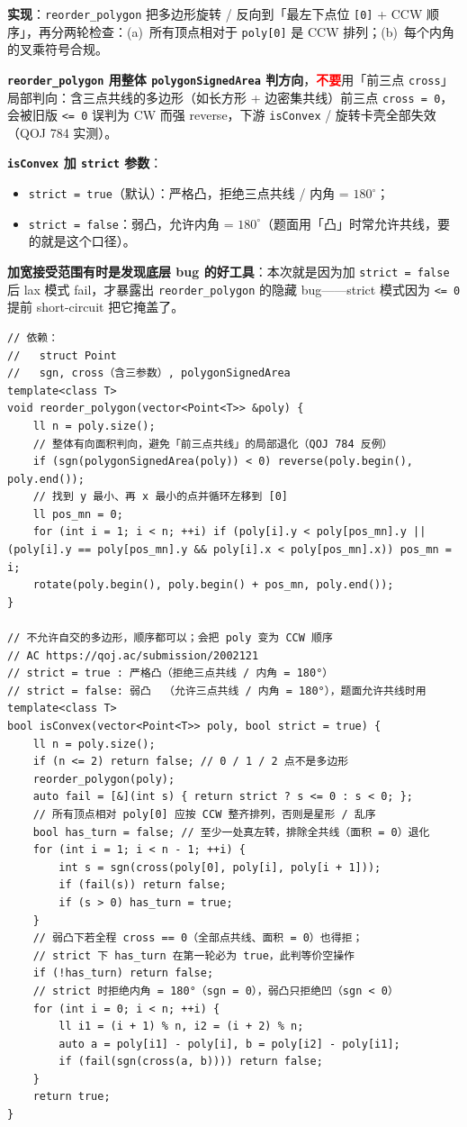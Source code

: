 		\textbf{实现}：\texttt{reorder\_polygon} 把多边形旋转 / 反向到「最左下点位 \texttt{[0]} + CCW 顺序」，再分两轮检查：(a)~所有顶点相对于 \texttt{poly[0]} 是 CCW 排列；(b)~每个内角的叉乘符号合规。

		\textbf{\texttt{reorder\_polygon} 用整体 \texttt{polygonSignedArea} 判方向}，\textcolor{red}{\textbf{不要}}用「前三点 \texttt{cross}」局部判向：含三点共线的多边形（如长方形 + 边密集共线）前三点 \texttt{cross = 0}，会被旧版 \texttt{<= 0} 误判为 CW 而强 reverse，下游 \texttt{isConvex} / 旋转卡壳全部失效（QOJ 784 实测）。

		\textbf{\texttt{isConvex} 加 \texttt{strict} 参数}：
		\begin{itemize}
					\setlength\itemsep{0pt}
				\item \texttt{strict = true}（默认）：严格凸，拒绝三点共线 / 内角 = $180^{\circ}$；
				\item \texttt{strict = false}：弱凸，允许内角 = $180^{\circ}$（题面用「凸」时常允许共线，要的就是这个口径）。
		\end{itemize}
		\textbf{加宽接受范围有时是发现底层 bug 的好工具}：本次就是因为加 \texttt{strict = false} 后 lax 模式 fail，才暴露出 \texttt{reorder\_polygon} 的隐藏 bug——strict 模式因为 \texttt{<= 0} 提前 short-circuit 把它掩盖了。

		\begin{verbatim}
// 依赖：
//   struct Point
//   sgn, cross（含三参数）, polygonSignedArea
template<class T>
void reorder_polygon(vector<Point<T>> &poly) {
	ll n = poly.size();
	// 整体有向面积判向，避免「前三点共线」的局部退化（QOJ 784 反例）
	if (sgn(polygonSignedArea(poly)) < 0) reverse(poly.begin(), poly.end());
	// 找到 y 最小、再 x 最小的点并循环左移到 [0]
	ll pos_mn = 0;
	for (int i = 1; i < n; ++i) if (poly[i].y < poly[pos_mn].y || (poly[i].y == poly[pos_mn].y && poly[i].x < poly[pos_mn].x)) pos_mn = i;
	rotate(poly.begin(), poly.begin() + pos_mn, poly.end());
}

// 不允许自交的多边形，顺序都可以；会把 poly 变为 CCW 顺序
// AC https://qoj.ac/submission/2002121
// strict = true : 严格凸（拒绝三点共线 / 内角 = 180°）
// strict = false: 弱凸  （允许三点共线 / 内角 = 180°），题面允许共线时用
template<class T>
bool isConvex(vector<Point<T>> poly, bool strict = true) {
	ll n = poly.size();
	if (n <= 2) return false; // 0 / 1 / 2 点不是多边形
	reorder_polygon(poly);
	auto fail = [&](int s) { return strict ? s <= 0 : s < 0; };
	// 所有顶点相对 poly[0] 应按 CCW 整齐排列，否则是星形 / 乱序
	bool has_turn = false; // 至少一处真左转，排除全共线（面积 = 0）退化
	for (int i = 1; i < n - 1; ++i) {
		int s = sgn(cross(poly[0], poly[i], poly[i + 1]));
		if (fail(s)) return false;
		if (s > 0) has_turn = true;
	}
	// 弱凸下若全程 cross == 0（全部点共线、面积 = 0）也得拒；
	// strict 下 has_turn 在第一轮必为 true，此判等价空操作
	if (!has_turn) return false;
	// strict 时拒绝内角 = 180°（sgn = 0），弱凸只拒绝凹（sgn < 0）
	for (int i = 0; i < n; ++i) {
		ll i1 = (i + 1) % n, i2 = (i + 2) % n;
		auto a = poly[i1] - poly[i], b = poly[i2] - poly[i1];
		if (fail(sgn(cross(a, b)))) return false;
	}
	return true;
}
		\end{verbatim}

